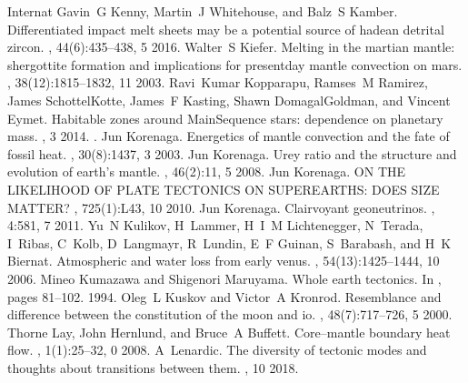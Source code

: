 \documentclass[letterpaper,10pt,english]{jupyterBook}
\begin{document}
\begin{sphinxthebibliography}{Internat}
\sphinxAtStartPar
Gavin G Kenny, Martin J Whitehouse, and Balz S Kamber. Differentiated impact melt sheets may be a potential source of hadean detrital zircon. , 44(6):435–438, 5 2016.
\sphinxAtStartPar
Walter S Kiefer. Melting in the martian mantle: shergottite formation and implications for present\sphinxhyphen{}day mantle convection on mars. , 38(12):1815–1832, 11 2003.
\sphinxAtStartPar
Ravi Kumar Kopparapu, Ramses M Ramirez, James SchottelKotte, James F Kasting, Shawn Domagal\sphinxhyphen{}Goldman, and Vincent Eymet. Habitable zones around Main\sphinxhyphen{}Sequence stars: dependence on planetary mass. , 3 2014. .
\sphinxAtStartPar
Jun Korenaga. Energetics of mantle convection and the fate of fossil heat. , 30(8):1437, 3 2003.
\sphinxAtStartPar
Jun Korenaga. Urey ratio and the structure and evolution of earth's mantle. , 46(2):11, 5 2008.
\sphinxAtStartPar
Jun Korenaga. ON THE LIKELIHOOD OF PLATE TECTONICS ON SUPER\sphinxhyphen{}EARTHS: DOES SIZE MATTER? , 725(1):L43, 10 2010.
\sphinxAtStartPar
Jun Korenaga. Clairvoyant geoneutrinos. , 4:581, 7 2011.
\sphinxAtStartPar
Yu N Kulikov, H Lammer, H I M Lichtenegger, N Terada, I Ribas, C Kolb, D Langmayr, R Lundin, E F Guinan, S Barabash, and H K Biernat. Atmospheric and water loss from early venus. , 54(13):1425–1444, 10 2006.
\sphinxAtStartPar
Mineo Kumazawa and Shigenori Maruyama. Whole earth tectonics. In , pages 81–102. 1994.
\sphinxAtStartPar
Oleg L Kuskov and Victor A Kronrod. Resemblance and difference between the constitution of the moon and io. , 48(7):717–726, 5 2000.
\sphinxAtStartPar
Thorne Lay, John Hernlund, and Bruce A Buffett. Core–mantle boundary heat flow. , 1(1):25–32, 0 2008.
\sphinxAtStartPar
A Lenardic. The diversity of tectonic modes and thoughts about transitions between them. , 10 2018.

\end{sphinxthebibliography}
\end{document}
